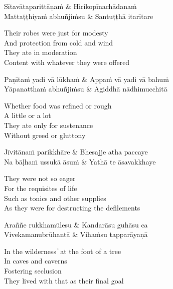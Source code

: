 \begin{twochants}
  Sītavātaparittāṇaṁ & Hirikopīnachādanaṁ\\
  Mattaṭṭhiyaṁ abhuñjiṁsu & Santuṭṭhā itarītare\\
\end{twochants}

\begin{english}
  Their robes were just for modesty\\
  And protection from cold and wind\\
  They ate in moderation\\
  Content with whatever they were offered
\end{english}

\begin{twochants}
  Paṇītaṁ yadi vā lūkhaṁ & Appaṁ vā yadi vā bahuṁ\\
  Yāpanatthaṁ abhuñjiṁsu & Agiddhā nādhimucchitā\\
\end{twochants}

\begin{english}
  Whether food was refined or rough\\
  A little or a lot\\
  They ate only for sustenance\\
  Without greed or gluttony
\end{english}

\begin{twochants}
  Jīvitānaṁ parikkhāre & Bhesajje atha paccaye\\
  Na bāḷhaṁ ussukā āsuṁ & Yathā te āsavakkhaye\\
\end{twochants}

\begin{english}
  They were not so eager\\
  For the requisites of life\\
  Such as tonics and other supplies\\
  As they were for destructing the defilements
\end{english}

\begin{twochants}
  Araññe rukkhamūlesu & Kandarāsu guhāsu ca\\
  Vivekamanubrūhantā & Vihaṁsu tapparāyaṇā\\
\end{twochants}

\begin{english}
  In the wilderness  ̓  at the foot of a tree\\
  In caves and caverns\\
  Fostering seclusion\\
  They lived with that as their final goal
\end{english}

